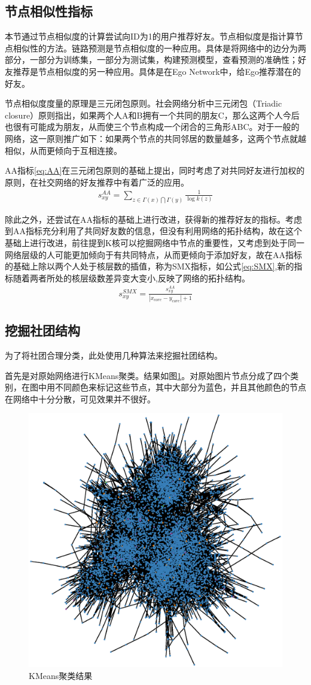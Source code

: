 \documentclass[10pt, a4paper]{article}
\begin{document}
\subsection{节点相似性指标}

本节通过节点相似度的计算尝试向ID为1的用户推荐好友。节点相似度是指计算节点相似性的方法。链路预测是节点相似度的一种应用。具体是将网络中的边分为两部分，一部分为训练集，一部分为测试集，构建预测模型，查看预测的准确性；好友推荐是节点相似度的另一种应用。具体是在Ego Network中，给Ego推荐潜在的好友。

节点相似度度量的原理是三元闭包原则。社会网络分析中三元闭包（Triadic closure）原则指出，如果两个人A和B拥有一个共同的朋友C，那么这两个人今后也很有可能成为朋友，从而使三个节点构成一个闭合的三角形ABC。对于一般的网络，这一原则推广如下：如果两个节点的共同邻居的数量越多，这两个节点就越相似，从而更倾向于互相连接。

AA指标\ref{eq:AA}在三元闭包原则的基础上提出，同时考虑了对共同好友进行加权的原则，在社交网络的好友推荐中有着广泛的应用。
\begin{align}\label{eq:AA}
	s_{xy}^{AA}=\sum_{z\in \Gamma(x)\bigcap\Gamma(y)}\frac{1}{\log k(z)}
\end{align}

除此之外，还尝试在AA指标的基础上进行改进，获得新的推荐好友的指标。考虑到AA指标充分利用了共同好友数的信息，但没有利用网络的拓扑结构，故在这个基础上进行改进，前往提到K核可以挖掘网络中节点的重要性，又考虑到处于同一网络层级的人可能更加倾向于有共同特点，从而更倾向于添加好友，故在AA指标的基础上除以两个人处于核层数的插值，称为SMX指标，如公式\ref{eq:SMX},新的指标随着两者所处的核层级数差异变大变小,反映了网络的拓扑结构。
\begin{align}\label{eq:SMX}
	s_{xy}^{SMX}=\frac{s_{xy}^{AA}}{|x_{core}-y_{core}|+1}
\end{align}


\subsection{挖掘社团结构}

为了将社团合理分类，此处使用几种算法来挖掘社团结构。

首先是对原始网络进行KMeans聚类。结果如图\ref{fig:KMeans}。对原始图片节点分成了四个类别，在图中用不同颜色来标记这些节点，其中大部分为蓝色，并且其他颜色的节点在网络中十分分散，可见效果并不很好。

\begin{figure}[tbph!]
	\centering
	\includegraphics[width=0.5\linewidth]{figures/KMeans聚类结果}
	\caption{KMeans聚类结果}
	\label{fig:KMeans}
\end{figure}
\end{document}

